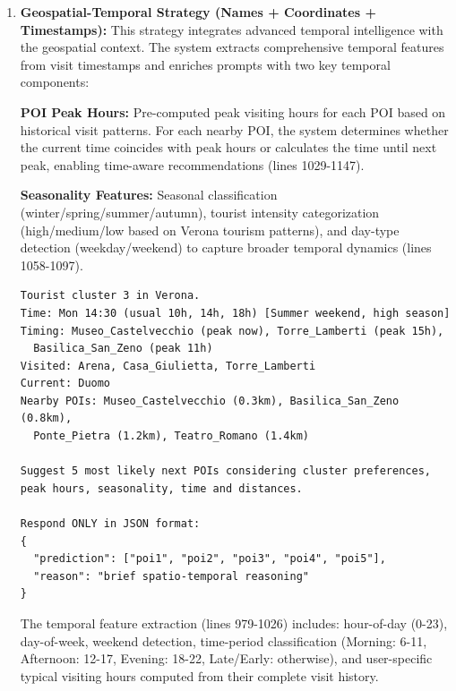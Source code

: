 \documentclass{article}
\begin{document}
\begin{enumerate}
\begin{lstlisting}[caption=Geospatial-Enhanced Prompt Template]
Suggest 5 most likely next POIs considering cluster preferences,
time and distances.

Respond ONLY in JSON format:
{
  "prediction": ["poi1", "poi2", "poi3", "poi4", "poi5"],
  "reason": "brief spatial reasoning"
}
\end{lstlisting}

The distance calculation uses the Haversine formula (lines 724-751 in implementation) to compute great-circle distances between coordinates, ensuring accurate geographic proximity estimates for urban-scale tourism scenarios.

\item \textbf{Geospatial-Temporal Strategy (Names + Coordinates + Timestamps):}
This strategy integrates advanced temporal intelligence with the geospatial context. The system extracts comprehensive temporal features from visit timestamps and enriches prompts with two key temporal components:

\textbf{POI Peak Hours:} Pre-computed peak visiting hours for each POI based on historical visit patterns. For each nearby POI, the system determines whether the current time coincides with peak hours or calculates the time until next peak, enabling time-aware recommendations (lines 1029-1147).

\textbf{Seasonality Features:} Seasonal classification (winter/spring/summer/autumn), tourist intensity categorization (high/medium/low based on Verona tourism patterns), and day-type detection (weekday/weekend) to capture broader temporal dynamics (lines 1058-1097).

\begin{lstlisting}[caption=Geospatial-Temporal Prompt Template]
Tourist cluster 3 in Verona.
Time: Mon 14:30 (usual 10h, 14h, 18h) [Summer weekend, high season]
Timing: Museo_Castelvecchio (peak now), Torre_Lamberti (peak 15h),
  Basilica_San_Zeno (peak 11h)
Visited: Arena, Casa_Giulietta, Torre_Lamberti
Current: Duomo
Nearby POIs: Museo_Castelvecchio (0.3km), Basilica_San_Zeno (0.8km),
  Ponte_Pietra (1.2km), Teatro_Romano (1.4km)

Suggest 5 most likely next POIs considering cluster preferences,
peak hours, seasonality, time and distances.

Respond ONLY in JSON format:
{
  "prediction": ["poi1", "poi2", "poi3", "poi4", "poi5"],
  "reason": "brief spatio-temporal reasoning"
}
\end{lstlisting}

The temporal feature extraction (lines 979-1026) includes: hour-of-day (0-23), day-of-week, weekend detection, time-period classification (Morning: 6-11, Afternoon: 12-17, Evening: 18-22, Late/Early: otherwise), and user-specific typical visiting hours computed from their complete visit history.


\end{enumerate}
\end{document}
